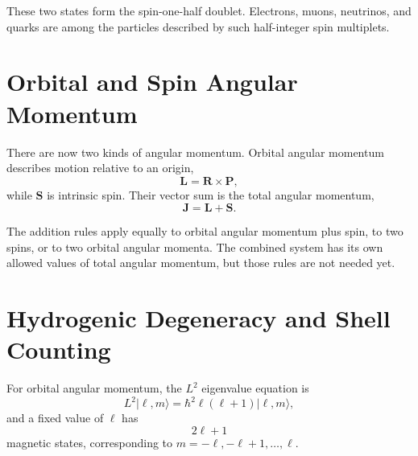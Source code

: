 These two states form the spin-one-half doublet. Electrons, muons, neutrinos, and quarks are among the particles described by such half-integer spin multiplets.

\section{Orbital and Spin Angular Momentum}

There are now two kinds of angular momentum. Orbital angular momentum describes motion relative to an origin,
\begin{equation}
\mathbf L=\mathbf R\times\mathbf P,
\end{equation}
while \(\mathbf S\) is intrinsic spin. Their vector sum is the total angular momentum,
\begin{equation}
\mathbf J=\mathbf L+\mathbf S.
\end{equation}

\begin{classroomqa}
\end{classroomqa}

The addition rules apply equally to orbital angular momentum plus spin, to two spins, or to two orbital angular momenta. The combined system has its own allowed values of total angular momentum, but those rules are not needed yet.

\begin{classroomqa}
\end{classroomqa}

\section{Hydrogenic Degeneracy and Shell Counting}

For orbital angular momentum, the \(L^{2}\) eigenvalue equation is
\begin{equation}
L^{2}\lvert\ell,m\rangle
=\hbar^{2}\ell(\ell+1)\lvert\ell,m\rangle,
\end{equation}
and a fixed value of \(\ell\) has
\begin{equation}
2\ell+1
\end{equation}
magnetic states, corresponding to \(m=-\ell,-\ell+1,\ldots,\ell\).

